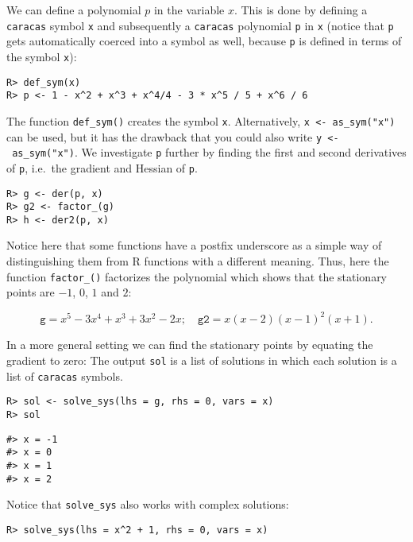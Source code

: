 We can define a polynomial \(p\) in the variable \(x\). This is done by
defining a \texttt{caracas} symbol \texttt{x} and subsequently a \texttt{caracas}
polynomial \texttt{p} in \texttt{x} (notice that \texttt{p} gets automatically coerced into
a symbol as well, because \texttt{p} is defined in terms of the symbol \texttt{x}):

\begin{verbatim}
R> def_sym(x)
R> p <- 1 - x^2 + x^3 + x^4/4 - 3 * x^5 / 5 + x^6 / 6
\end{verbatim}

The function \texttt{def\_sym()} creates the symbol \texttt{x}.
Alternatively, \texttt{x\ \textless{}-\ as\_sym("x")} can be used,
but it has the drawback that you could also write \texttt{y\ \textless{}-\ as\_sym("x")}.
We investigate \texttt{p} further by finding the first and second derivatives of \texttt{p}, i.e.~the gradient and Hessian of
\texttt{p}.

\begin{verbatim}
R> g <- der(p, x)
R> g2 <- factor_(g)
R> h <- der2(p, x)
\end{verbatim}

Notice here that some functions have a postfix underscore as a simple
way of distinguishing them from R functions with a different
meaning. Thus, here the function \texttt{factor\_()} factorizes the polynomial
which shows that the stationary points are
\(-1\), \(0\), \(1\) and \(2\):

\begin{equation}
 \texttt{g}  = x^{5} - 3 x^{4} + x^{3} + 3 x^{2} - 2 x; \quad
 \texttt{g2}  = x \left(x - 2\right) \left(x - 1\right)^{2} \left(x + 1\right).
\end{equation}

In a more general setting we can find the stationary points by equating the gradient to zero:
The output \texttt{sol} is a list of solutions in which each solution is a list of \texttt{caracas} symbols.

\begin{verbatim}
R> sol <- solve_sys(lhs = g, rhs = 0, vars = x)
R> sol
\end{verbatim}

\begin{verbatim}
#> x = -1
#> x = 0
#> x = 1
#> x = 2
\end{verbatim}

Notice that \texttt{solve\_sys} also works with complex solutions:

\begin{verbatim}
R> solve_sys(lhs = x^2 + 1, rhs = 0, vars = x)
\end{verbatim}

